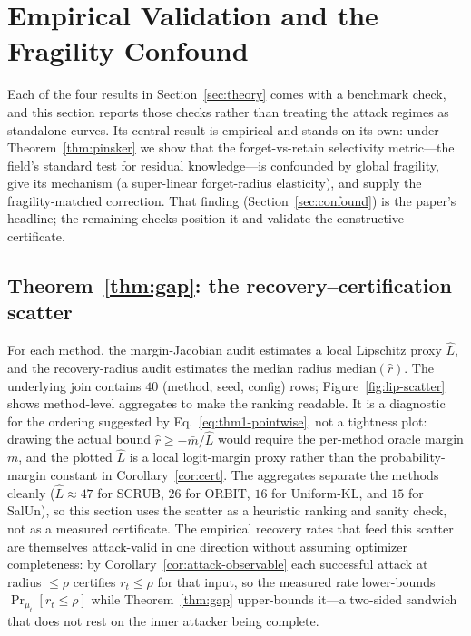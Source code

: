 \documentclass[11pt]{article}
\begin{document}
\section{Empirical Validation and the Fragility Confound}
\label{sec:validation}
Each of the four results in Section~\ref{sec:theory} comes with a benchmark check, and this section reports those checks rather than treating the attack regimes as standalone curves. Its central result is empirical and stands on its own: under Theorem~\ref{thm:pinsker} we show that the forget-vs-retain selectivity metric---the field's standard test for residual knowledge---is confounded by global fragility, give its mechanism (a super-linear forget-radius elasticity), and supply the fragility-matched correction. That finding (Section~\ref{sec:confound}) is the paper's headline; the remaining checks position it and validate the constructive certificate.

\subsection{Theorem~\ref{thm:gap}: the recovery--certification scatter}
For each method, the margin-Jacobian audit estimates a local Lipschitz proxy $\hat L$, and the recovery-radius audit estimates the median radius $\mathrm{median}(\hat r)$. The underlying join contains $40$ (method, seed, config) rows; Figure~\ref{fig:lip-scatter} shows method-level aggregates to make the ranking readable. It is a diagnostic for the ordering suggested by Eq.~\eqref{eq:thm1-pointwise}, not a tightness plot: drawing the actual bound $\hat r \geq -\bar m/\hat L$ would require the per-method oracle margin $\bar m$, and the plotted $\hat L$ is a local logit-margin proxy rather than the probability-margin constant in Corollary~\ref{cor:cert}. The aggregates separate the methods cleanly ($\hat L \approx 47$ for SCRUB, $26$ for ORBIT, $16$ for Uniform-KL, and $15$ for SalUn), so this section uses the scatter as a heuristic ranking and sanity check, not as a measured certificate. The empirical recovery rates that feed this scatter are themselves attack-valid in one direction without assuming optimizer completeness: by Corollary~\ref{cor:attack-observable} each successful attack at radius $\le\rho$ certifies $r_t\le\rho$ for that input, so the measured rate lower-bounds $\Pr_{\mu_t}[r_t\le\rho]$ while Theorem~\ref{thm:gap} upper-bounds it---a two-sided sandwich that does not rest on the inner attacker being complete.
\end{document}
